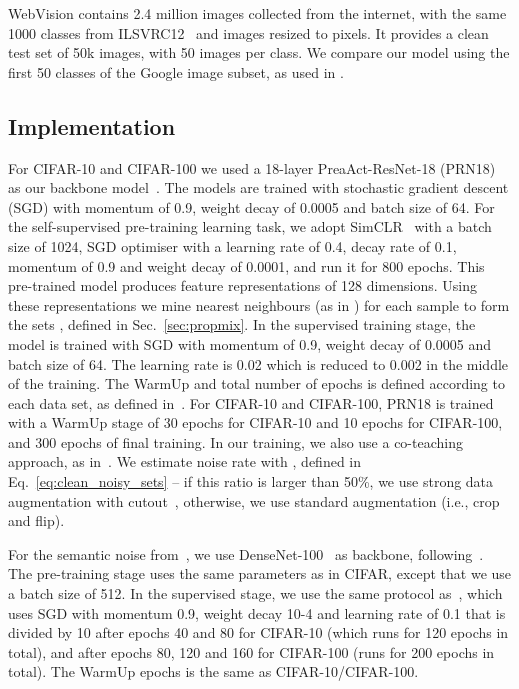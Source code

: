 \documentclass{bmvc2k}
\begin{document}
 WebVision contains 2.4 million images collected from the internet, with the same 1000 classes from ILSVRC12~\citep{deng2009imagenet} and images resized  to  pixels. It provides a clean test set of 50k images, with 50 images per class. We compare our model using the first 50 classes of the Google image subset, as used in \cite{DivideMix, chen2019understanding}.





\subsection{Implementation}

For CIFAR-10 and CIFAR-100 we used a 18-layer 
PreaAct-ResNet-18 (PRN18)~\citep{he2016identity}  
as our backbone model~\citep{DivideMix}. The models are trained with stochastic gradient descent (SGD) with momentum of 0.9, weight decay of 0.0005 and batch size of 64. For the self-supervised pre-training learning task, we adopt SimCLR~\citep{SimCLR} with a batch size of 1024, SGD optimiser with a learning rate of 0.4, decay rate of 0.1, momentum of 0.9 and weight decay of 0.0001, and run it for 800 epochs.  This pre-trained model produces feature representations of 128 dimensions. Using these representations we mine  nearest neighbours (as in \citep{SCAN}) for each sample to form the sets , defined in Sec.~\ref{sec:propmix}. In the supervised training stage, the model is trained with SGD with momentum of 0.9, weight decay of 0.0005 and batch size of 64. The learning rate is 0.02 which is reduced to 0.002 in the middle of the training. The WarmUp and total number of epochs is defined according to each data set, as defined in~\citep{DivideMix}. 
For CIFAR-10 and CIFAR-100, PRN18 is trained with a WarmUp stage of 30 epochs for CIFAR-10 and 10 epochs for CIFAR-100, and 300 epochs of final training. In our training, we also use a co-teaching approach, as in~\citep{DivideMix, elr2020, han2018co}. 
We estimate noise rate with , defined in Eq.~\ref{eq:clean_noisy_sets} -- if this ratio is larger than 50\%, we use strong data augmentation with cutout~\citep{cubuk2019autoaugment}, otherwise, we use standard augmentation (i.e., crop and flip). 

For the semantic noise from~\citep{rog}, we use  DenseNet-100~\citep{iandola2014densenet} as backbone, following~\citep{rog}. The pre-training stage uses the same parameters as in CIFAR, except that we use a batch size of 512. In the supervised stage, we use the same protocol as~\citep{rog}, which uses SGD with momentum 0.9, weight decay 10-4 and learning rate of 0.1 that is divided by 10 after epochs 40 and 80 for CIFAR-10 (which runs for 120 epochs in total), and after epochs 80, 120 and 160 for CIFAR-100 (runs for 200 epochs in total). The WarmUp epochs is the same as CIFAR-10/CIFAR-100.
\end{document}
